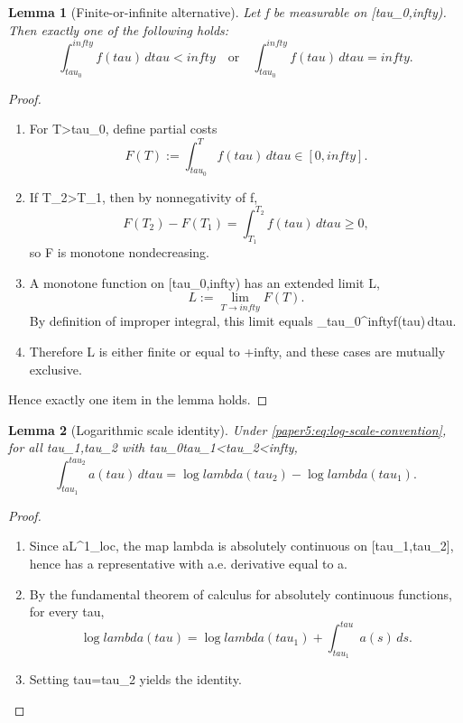 \documentclass[11pt]{amsart}
\def\({}%
\def\){}%
\def\mathrm#1{#1}%
\def\tau{tau}%
\def\lambda{lambda}%
\def\infty{infty}%
\theoremstyle{plain}
\newtheorem{lemma}[lemma]{Lemma}
\theoremstyle{definition}
\theoremstyle{remark}
\begin{document}
\begin{lemma}[Finite-or-infinite alternative]\label{paper5:lem:finite-infinite}
Let \(f\) be measurable on \([\tau_0,\infty)\). Then exactly one of the following holds:
\[
  \int_{\tau_0}^{\infty}f(\tau)
  \,d\tau<\infty
  \quad\text{or}\quad
  \int_{\tau_0}^{\infty}f(\tau)
  \,d\tau=\infty.
\]
\end{lemma}

\begin{proof}
\begin{enumerate}[label=(\arabic*)]
  \item For \(T>\tau_0\), define partial costs
  \[
    F(T):=\int_{\tau_0}^{T}f(\tau)
    \,d\tau\in[0,\infty].
  \]

  \item If \(T_2>T_1\), then by nonnegativity of \(f\),
  \[
    F(T_2)-F(T_1)=\int_{T_1}^{T_2}f(\tau)
    \,d\tau\ge0,
  \]
  so \(F\) is monotone nondecreasing.

  \item A monotone function on \([\tau_0,\infty)\) has an extended limit
  \(L\in[0,\infty]\),
  \[
    L:=\lim_{T\to\infty}F(T).
  \]
  By definition of improper integral, this limit equals
  \(\int_{\tau_0}^{\infty}f(\tau)\,d\tau\).

  \item Therefore \(L\) is either finite or equal to \(+\infty\), and these
  cases are mutually exclusive.
\end{enumerate}
Hence exactly one item in the lemma holds.
\end{proof}

\begin{lemma}[Logarithmic scale identity]\label{paper5:lem:log-scale}
Under \eqref{paper5:eq:log-scale-convention}, for all \(\tau_1,\tau_2\) with
\(\tau_0\le\tau_1<\tau_2<\infty\),
\[
  \int_{\tau_1}^{\tau_2}a(\tau)
  \,d\tau
  =\log\lambda(\tau_2)-\log\lambda(\tau_1).
\]
\end{lemma}

\begin{proof}
\begin{enumerate}[label=(\arabic*)]
  \item Since \(a\in L^1_{\mathrm{loc}}\), the map
  \(\log\lambda\) is absolutely continuous on \([\tau_1,\tau_2]\), hence has a
  representative with a.e. derivative equal to \(a\).

  \item By the fundamental theorem of calculus for absolutely continuous functions,
  for every \(\tau\in[\tau_1,\tau_2]\),
  \[
    \log\lambda(\tau)=\log\lambda(\tau_1)+\int_{\tau_1}^{\tau}a(s)
    \,ds.
  \]

  \item Setting \(\tau=\tau_2\) yields the identity.
\end{enumerate}
\end{proof}
\end{document}
